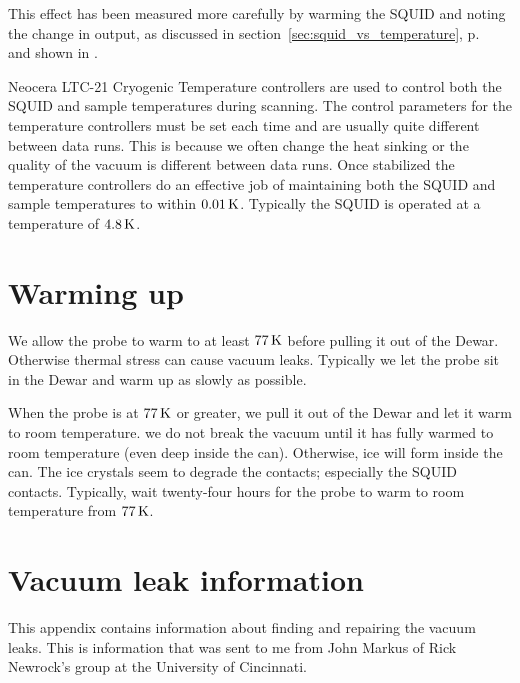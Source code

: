 This effect has been measured more carefully by warming the SQUID and noting
the change in output, as discussed in section~\ref{sec:squid_vs_temperature},
p.~\pageref{sec:squid_vs_temperature} and shown in 
.

Neocera LTC-21 Cryogenic Temperature controllers are used to control 
both the SQUID and sample temperatures during scanning. The control 
parameters
for the temperature controllers must be set each time and are usually 
quite different between data runs. This is because we often change 
the heat sinking
or the quality of the vacuum is different between
data runs. Once stabilized the temperature controllers do an effective
job of maintaining both the SQUID and sample temperatures to 
within $0.01\,\kelvin$. Typically the SQUID is operated at a temperature of 
$4.8\,\kelvin$. 

\section{Warming up}

We allow the probe to warm to at least $77\,\kelvin$ before pulling
it out of the Dewar.
 Otherwise thermal stress can cause vacuum 
leaks. Typically we let the probe sit in the Dewar and warm up 
as slowly as possible. 

When the probe is at $77\,\kelvin$ or greater, we pull it out of the
Dewar and let it warm to room temperature. we do not break the vacuum
until it has fully warmed to room temperature (even deep inside the
can). Otherwise, ice will form inside the can. The ice crystals 
seem to degrade the contacts; especially the SQUID contacts. 
Typically, wait twenty-four hours for the probe to warm to room 
temperature from $77\,\kelvin$.
 

\section{Vacuum leak information}

This appendix contains information about finding and repairing the
vacuum leaks. This is information that was sent to me from John Markus
of Rick
Newrock's group at the University of Cincinnati. 

